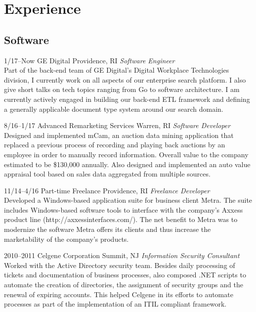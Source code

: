 \documentclass[]{friggeri-cv}
\begin{document}
\section{Experience}

\subsection{Software}

\begin{entrylist}


\entry
{1/17--Now}
{GE Digital}
{Providence, RI}
{\emph{Software Engineer} \\
Part of the back-end team of GE Digital's Digital Workplace Technologies division, I currently work on all aspects of our enterprise search platform.  I also give short talks on tech topics ranging from Go to software architecture.  I am currently actively engaged in building our back-end ETL framework and defining a generally applicable document type system around our search domain.}

\entry
{8/16--1/17}
{Advanced Remarketing Services}
{Warren, RI}
{\emph{Software Developer} \\
Designed and implemented mCam, an auction data mining application that replaced a previous process of recording and playing back auctions by an employee in order to manually record information. Overall value to the company estimated to be \$130,000 annually.  Also designed and implemented an auto value appraisal tool based on sales data aggregated from multiple sources.}

\entry
{11/14--4/16}
{Part-time Freelance}
{Providence, RI}
{\emph{Freelance Developer} \\
Developed a Windows-based application suite for business client Metra.  The suite includes Windows-based software tools to interface with the company's Axxess product line (http://axxessinterfaces.com/).  The net benefit to Metra was to modernize the software Metra offers its clients and thus increase the marketability of the company's products. }

\end{entrylist}
\begin{entrylist}
\entry
{2010--2011}
{Celgene Corporation}
{Summit, NJ}
{\emph{Information Security Consultant} \\
Worked with the Active Directory security team.  Besides daily processing of tickets and documentation of business processes, also composed .NET scripts to automate the creation of directories, the assignment of security groups and the renewal of expiring accounts.   This helped Celgene in its efforts to automate processes as part of the implementation of an ITIL compliant framework.}

\\ \\ \\
\end{entrylist}
\end{document}
